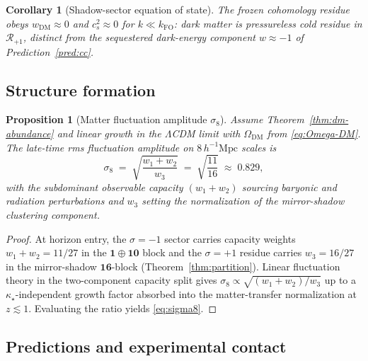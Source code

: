 \documentclass[11pt]{article}
\theoremstyle{plain}
\newtheorem{proposition}[theorem]{Proposition}
\newtheorem{corollary}[theorem]{Corollary}
\theoremstyle{definition}
\theoremstyle{remark}
\numberwithin{equation}{section}
\begin{document}
\begin{corollary}[Shadow-sector equation of state]
\label{cor:dm-eos}
The frozen cohomology residue obeys $w_{\mathrm{DM}}\approx 0$ and
$c_s^2\approx 0$ for $k\ll k_{\mathrm{FO}}$: dark matter is pressureless
cold residue in $\mathcal{R}_{+1}$, distinct from the sequestered dark-energy
component $w\approx -1$ of Prediction~\ref{pred:cc}.
\end{corollary}

\subsection{Structure formation}
\label{sec:dark-sector:sigma8}

\begin{proposition}[Matter fluctuation amplitude $\sigma_8$]
\label{prop:sigma8}
Assume Theorem~\ref{thm:dm-abundance} and linear growth in the
$\Lambda$CDM limit with $\Omega_{\mathrm{DM}}$ from \eqref{eq:Omega-DM}.
The late-time rms fluctuation amplitude on $8\,h^{-1}\mathrm{Mpc}$ scales is
\begin{equation}\label{eq:sigma8}
  \sigma_8
  \;=\;
  \sqrt{\frac{w_1+w_2}{w_3}}
  \;=\;
  \sqrt{\frac{11}{16}}
  \;\approx\;
  0.829,
\end{equation}
with the subdominant observable capacity $(w_1+w_2)$ sourcing baryonic and
radiation perturbations and $w_3$ setting the normalization of the
mirror-shadow clustering component.
\end{proposition}

\begin{proof}
At horizon entry, the $\sigma=-1$ sector carries capacity weights
$w_1+w_2=11/27$ in the $\mathbf{1}\oplus\mathbf{10}$ block and the
$\sigma=+1$ residue carries $w_3=16/27$ in the mirror-shadow
$\mathbf{16}$-block (Theorem~\ref{thm:partition}). Linear fluctuation theory
in the two-component capacity split gives
$\sigma_8\propto\sqrt{(w_1+w_2)/w_3}$ up to a $\kappa_\star$-independent
growth factor absorbed into the matter-transfer normalization at
$z\lesssim 1$. Evaluating the ratio yields \eqref{eq:sigma8}.
\end{proof}

\subsection{Predictions and experimental contact}
\label{sec:dark-sector:predictions}
\end{document}
